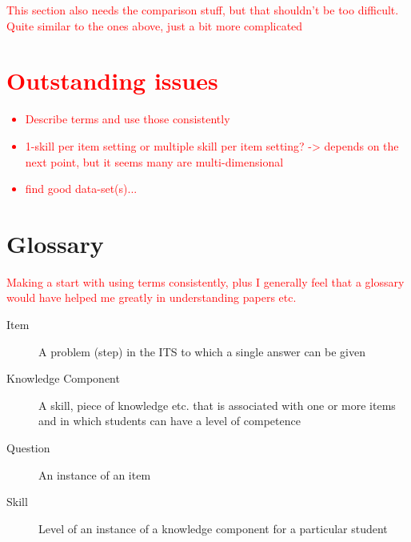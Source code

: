 \documentclass{article}
\newcommand\todo[1]{\textcolor{red}{#1}}
\begin{document}
\todo{
This section also needs the comparison stuff, but that shouldn't be too difficult. Quite similar to the ones above, just a bit more complicated
\section{Outstanding issues}
\begin{itemize}
\item Describe terms and use those consistently
\item 1-skill per item setting or multiple skill per item setting? -> depends on the next point, but it seems many are multi-dimensional
\item find good data-set(s)...
\end{itemize}
}

\newpage
\appendix
\section{Glossary}
\todo{
Making a start with using terms consistently, plus I generally feel that a glossary would have helped me greatly in understanding papers etc.}
\begin{description}
  \item[Item] A problem (step) in the ITS to which a single answer can be given
  \item[Knowledge Component] A skill, piece of knowledge etc. that is associated with one or more items and in which students can have a level of competence
  \item[Question] An instance of an item
  \item[Skill] Level of an instance of a knowledge component for a particular student
\end{description}
\end{document}

